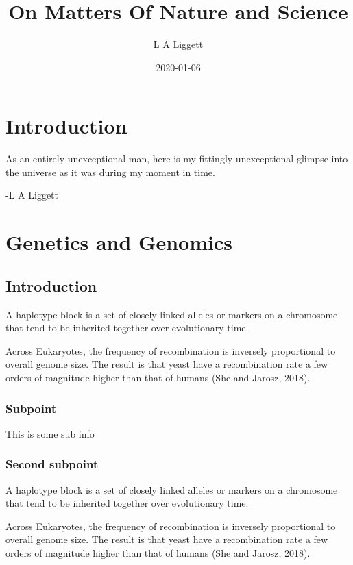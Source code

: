\documentclass[]{book}
\title{On Matters Of Nature and Science}
\author{L A Liggett}
\date{2020-01-06}
\begin{document}
\maketitle

{
\setcounter{tocdepth}{1}
\tableofcontents
}
\hypertarget{introduction}{%
\chapter{Introduction}\label{introduction}}

As an entirely unexceptional man, here is my fittingly unexceptional glimpse into the universe as it was during my moment in time.

-L A Liggett

\hypertarget{g2}{%
\chapter{Genetics and Genomics}\label{g2}}

\hypertarget{introduction-1}{%
\section{Introduction}\label{introduction-1}}

A haplotype block is a set of closely linked alleles or markers on a chromosome that tend to be inherited together over evolutionary time.

Across Eukaryotes, the frequency of recombination is inversely proportional to overall genome size. The result is that yeast have a recombination rate a few orders of magnitude higher than that of humans (She and Jarosz, 2018).

\hypertarget{subpoint}{%
\subsection{Subpoint}\label{subpoint}}

This is some sub info

\hypertarget{second-subpoint}{%
\subsection{Second subpoint}\label{second-subpoint}}

A haplotype block is a set of closely linked alleles or markers on a chromosome that tend to be inherited together over evolutionary time.

Across Eukaryotes, the frequency of recombination is inversely proportional to overall genome size. The result is that yeast have a recombination rate a few orders of magnitude higher than that of humans (She and Jarosz, 2018).
\end{document}
